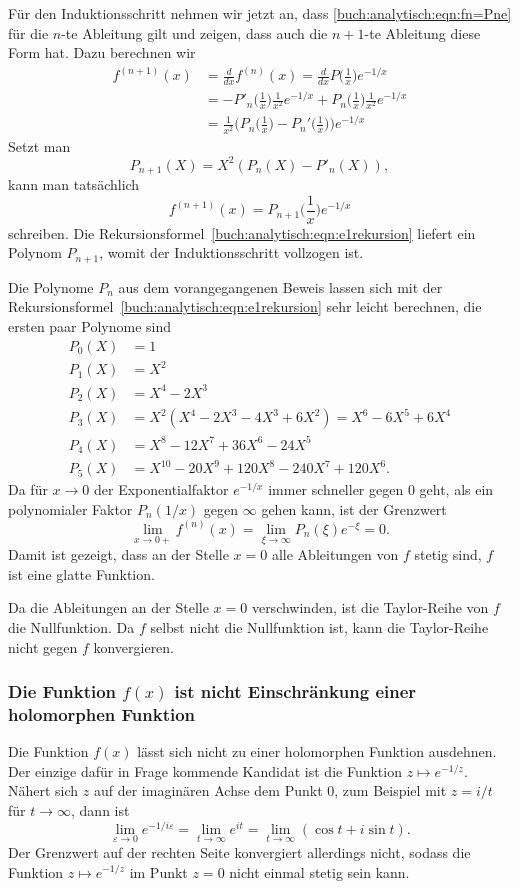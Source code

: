 Für den Induktionsschritt nehmen wir jetzt an, dass 
\eqref{buch:analytisch:eqn:fn=Pne}
für die $n$-te Ableitung gilt und zeigen, dass auch die $n+1$-te
Ableitung diese Form hat.
Dazu berechnen wir
\begin{align*}
f^{(n+1)}(x)
&=
\frac{d}{dx}
f^{(n)}(x)
=
\frac{d}{dx} P\biggl(\frac1x\biggr) e^{-1/x}
\\
&=
-P'_n\biggl(\frac1x\biggr) \frac{1}{x^2} e^{-1/x}
+
P_n\biggl(\frac1x\biggr) \frac{1}{x^2} e^{-1/x}
\\
&=
\frac{1}{x^2}
\biggl(
P_n\biggl(\frac1x\biggr)
-
P_n'\biggl(\frac1x\biggr)
\biggr)e^{-1/x}
\end{align*}
Setzt man 
\begin{equation}
P_{n+1}(X)
=
X^2(P_n(X) - P'_n(X)),
\label{buch:analytisch:eqn:e1rekursion}
\end{equation}
kann man tatsächlich
\[
f^{(n+1)}(x)
=
P_{n+1}\biggl(\frac1x\biggr)e^{-1/x}
\]
schreiben.
Die Rekursionsformel~\eqref{buch:analytisch:eqn:e1rekursion}
liefert ein Polynom $P_{n+1}$, womit der Induktionsschritt vollzogen
ist.

Die Polynome $P_n$ aus dem vorangegangenen Beweis lassen sich
mit der Rekursionsformel~\eqref{buch:analytisch:eqn:e1rekursion}
sehr leicht berechnen, die ersten paar Polynome sind
\begin{align*}
P_0(X) &= 1 \\
P_1(X) &= X^2 \\
P_2(X) &= X^4 - 2X^3 \\
P_3(X) &= X^2 (X^4 - 2X^3 - 4X^3 + 6X^2) = X^6 -6X^5+6X^4 \\
P_4(X) &= X^8 -12X^7+36X^6-24X^5 \\
P_5(X) &= X^{10} -20X^9 +120 X^8 - 240X^7 + 120 X^6.
\end{align*}
Da für $x\to 0$ der Exponentialfaktor $e^{-1/x}$ immer schneller
gegen $0$ geht, als ein polynomialer Faktor $P_n(1/x)$ gegen $\infty$
gehen kann, ist der Grenzwert 
\[
\lim_{x\to 0+}
f^{(n)}(x)
=
\lim_{\xi\to \infty}
P_n(\xi) e^{-\xi}
=
0.
\]
Damit ist gezeigt, dass an der Stelle $x=0$ alle Ableitungen von $f$
stetig sind, $f$ ist eine glatte Funktion.

Da die Ableitungen an der Stelle $x=0$ verschwinden, ist die
Taylor-Reihe von $f$ die Nullfunktion.
Da $f$ selbst nicht die Nullfunktion ist, kann die Taylor-Reihe
nicht gegen $f$ konvergieren.
%
%
\subsubsection{Die Funktion $f(x)$ ist nicht Einschränkung einer holomorphen Funktion}
Die Funktion $f(x)$ lässt sich nicht zu einer holomorphen Funktion
ausdehnen.
Der einzige dafür in Frage kommende Kandidat ist die Funktion
$z\mapsto e^{-1/z}$.
Nähert sich $z$ auf der imaginären Achse dem Punkt $0$, zum Beispiel
mit $z=i/t$ für $t\to \infty$, dann ist
\[
\lim_{\varepsilon\to 0} e^{-1/i\varepsilon}
=
\lim_{t\to\infty} e^{it}
=
\lim_{t\to\infty}(\cos t + i\sin t).
\]
Der Grenzwert auf der rechten Seite konvergiert allerdings nicht, sodass
die Funktion $z\mapsto e^{-1/z}$ im Punkt $z=0$ nicht einmal stetig
sein kann.

